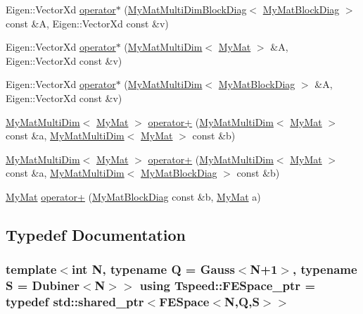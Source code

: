 \begin{DoxyCompactItemize}
Eigen\-::\-Vector\-Xd \hyperlink{namespaceTspeed_a50c55e28e30f425387c5cd23c59fbcbc}{operator$\ast$} (\hyperlink{classTspeed_1_1MyMatMultiDimBlockDiag}{My\-Mat\-Multi\-Dim\-Block\-Diag}$<$ \hyperlink{classTspeed_1_1MyMatBlockDiag}{My\-Mat\-Block\-Diag} $>$ const \&A, Eigen\-::\-Vector\-Xd const \&v)
\item 
Eigen\-::\-Vector\-Xd \hyperlink{namespaceTspeed_a9c66d3a5dfbcc24d4a5a60af27d25e79}{operator$\ast$} (\hyperlink{classTspeed_1_1MyMatMultiDim}{My\-Mat\-Multi\-Dim}$<$ \hyperlink{classTspeed_1_1MyMat}{My\-Mat} $>$ \&A, Eigen\-::\-Vector\-Xd const \&v)
\item 
Eigen\-::\-Vector\-Xd \hyperlink{namespaceTspeed_aa1cf50773f63e4c0cde90696c38e8a70}{operator$\ast$} (\hyperlink{classTspeed_1_1MyMatMultiDim}{My\-Mat\-Multi\-Dim}$<$ \hyperlink{classTspeed_1_1MyMatBlockDiag}{My\-Mat\-Block\-Diag} $>$ \&A, Eigen\-::\-Vector\-Xd const \&v)
\item 
\hyperlink{classTspeed_1_1MyMatMultiDim}{My\-Mat\-Multi\-Dim}$<$ \hyperlink{classTspeed_1_1MyMat}{My\-Mat} $>$ \hyperlink{namespaceTspeed_aba1b7bce0d7c55cda2d7452fe2675879}{operator+} (\hyperlink{classTspeed_1_1MyMatMultiDim}{My\-Mat\-Multi\-Dim}$<$ \hyperlink{classTspeed_1_1MyMat}{My\-Mat} $>$ const \&a, \hyperlink{classTspeed_1_1MyMatMultiDim}{My\-Mat\-Multi\-Dim}$<$ \hyperlink{classTspeed_1_1MyMat}{My\-Mat} $>$ const \&b)
\item 
\hyperlink{classTspeed_1_1MyMatMultiDim}{My\-Mat\-Multi\-Dim}$<$ \hyperlink{classTspeed_1_1MyMat}{My\-Mat} $>$ \hyperlink{namespaceTspeed_aa89f27c4c9e53c2e7ec8e25f2e1451de}{operator+} (\hyperlink{classTspeed_1_1MyMatMultiDim}{My\-Mat\-Multi\-Dim}$<$ \hyperlink{classTspeed_1_1MyMat}{My\-Mat} $>$ const \&a, \hyperlink{classTspeed_1_1MyMatMultiDim}{My\-Mat\-Multi\-Dim}$<$ \hyperlink{classTspeed_1_1MyMatBlockDiag}{My\-Mat\-Block\-Diag} $>$ const \&b)
\item 
\hyperlink{classTspeed_1_1MyMat}{My\-Mat} \hyperlink{namespaceTspeed_a5c1d03d05f350c1ae6239e07f80b6eb8}{operator+} (\hyperlink{classTspeed_1_1MyMatBlockDiag}{My\-Mat\-Block\-Diag} const \&b, \hyperlink{classTspeed_1_1MyMat}{My\-Mat} a)
\end{DoxyCompactItemize}


\subsection{Typedef Documentation}
\hypertarget{namespaceTspeed_a05fcb57094666c8f5ab1e90d1a6fecf8}{
\subsubsection[{F\-E\-Space\-\_\-ptr}]{\setlength{\rightskip}{0pt plus 5cm}template$<$int N, typename Q  = Gauss$<$\-N+1$>$, typename S  = Dubiner$<$\-N$>$$>$ using {\bf Tspeed\-::\-F\-E\-Space\-\_\-ptr} = typedef std\-::shared\-\_\-ptr$<${\bf F\-E\-Space}$<$N,Q,S$>$$>$}}\label{namespaceTspeed_a05fcb57094666c8f5ab1e90d1a6fecf8}


